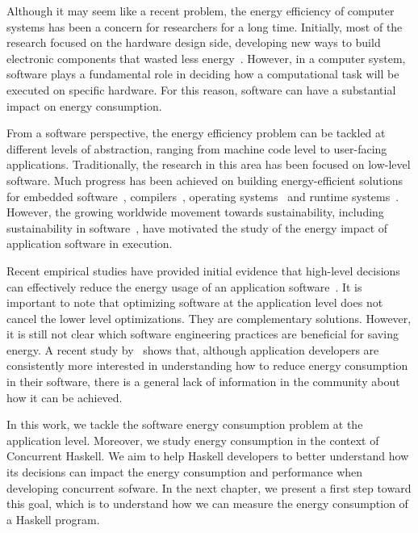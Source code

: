 Although it may seem like a recent problem, the energy efficiency of computer systems has been a concern for researchers for a long time. Initially, most of the research focused on the hardware design side, developing new ways to build electronic components that wasted less energy~\cite{chandrakasan:1992}. However, in a computer system, software plays a fundamental role in deciding how a computational task will be executed on specific hardware. For this reason, software can have a substantial impact on energy consumption.

From a software perspective, the energy efficiency problem can be tackled at different levels of abstraction, ranging from machine code level to user-facing applications. Traditionally, the research in this area has been focused on low-level software. Much progress has been achieved on building energy-efficient solutions for embedded software~\cite{tiwari:1994}, compilers~\cite{hsu:2003}, operating systems~\cite{merkel:2006} and runtime systems~\cite{ribic:2014, farkas:2000}. However, the growing worldwide movement towards sustainability, including sustainability in software~\cite{becker:2015}, have motivated the study of the energy impact of application software in execution.

Recent empirical studies have provided initial evidence that high-level decisions can effectively reduce the energy usage of an application software~\cite{chung:2001,hindle:2012,pinto:2014,trefethen:2013,manotas:2014, sahin:2012,sahin:2014}. It is important to note that optimizing software at the application level does not cancel the lower level optimizations. They are complementary solutions. However, it is still not clear which software engineering practices are beneficial for saving energy. A recent study by~ shows that, although application developers are consistently more interested in understanding how to reduce energy consumption in their software, there is a general lack of information in the community about how it can be achieved.

In this work, we tackle the software energy consumption problem at the application level. Moreover, we study energy consumption in the context of Concurrent Haskell. We aim to help Haskell developers to better understand how its decisions can impact the energy consumption and performance when developing  concurrent sofware. In the next chapter, we present a first step toward this goal, which is to understand how we can measure the energy consumption of a Haskell program.

